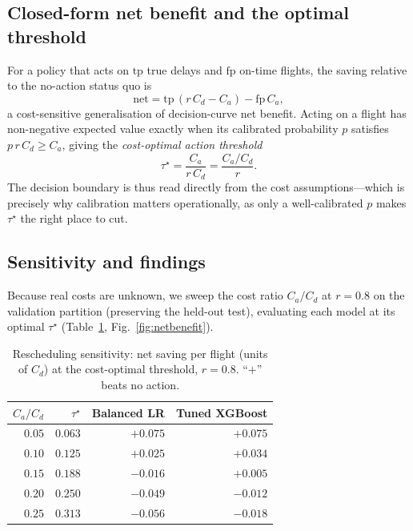 \documentclass[conference]{IEEEtran}
\begin{document}
\subsection{Closed-form net benefit and the optimal threshold}
For a policy that acts on $\mathrm{tp}$ true delays and $\mathrm{fp}$ on-time
flights, the saving relative to the no-action status quo is
\begin{equation}
\text{net} = \mathrm{tp}\,(r\,C_d - C_a) - \mathrm{fp}\,C_a,
\label{eq:net}
\end{equation}
a cost-sensitive generalisation of decision-curve net benefit.
Acting on a flight has non-negative expected value exactly when its calibrated
probability $p$ satisfies $p\,r\,C_d \geq C_a$, giving the \emph{cost-optimal
action threshold}
\begin{equation}
\tau^\star = \frac{C_a}{r\,C_d} = \frac{C_a/C_d}{r}.
\label{eq:tau}
\end{equation}
The decision boundary is thus read directly from the cost assumptions---which is
precisely why calibration matters operationally, as only a well-calibrated $p$
makes $\tau^\star$ the right place to cut.

\subsection{Sensitivity and findings}
Because real costs are unknown, we sweep the cost ratio $C_a/C_d$ at
$r=0.8$ on the validation partition (preserving the held-out test), evaluating
each model at its optimal $\tau^\star$ (Table~\ref{tab:sweep},
Fig.~\ref{fig:netbenefit}).

\begin{table}[!t]
  \caption{Rescheduling sensitivity: net saving per flight (units of $C_d$) at
  the cost-optimal threshold, $r=0.8$. ``$+$'' beats no action.}
  \label{tab:sweep}
  \centering
  \begin{tabular}{rrrr}
    \toprule
    $C_a/C_d$ & $\tau^\star$ & Balanced LR & Tuned XGBoost \\
    \midrule
    $0.05$ & $0.063$ & $+0.075$ & $+0.075$ \\
    $0.10$ & $0.125$ & $+0.025$ & $+0.034$ \\
    $0.15$ & $0.188$ & $-0.016$ & $+0.005$ \\
    $0.20$ & $0.250$ & $-0.049$ & $-0.012$ \\
    $0.25$ & $0.313$ & $-0.056$ & $-0.018$ \\
    \bottomrule
  \end{tabular}
\end{table}
\end{document}
